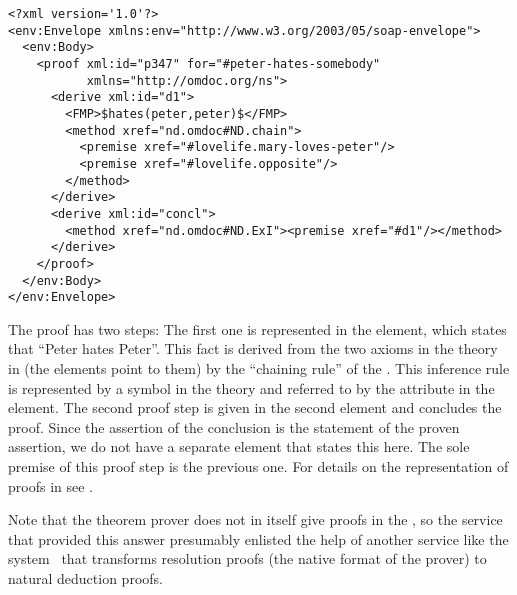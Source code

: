 \begin{omgroup}[id=rpc,short=Communication between Systems]
\begin{lstlisting}[label=lst:rpc-proof,mathescape,
  caption={A proof that Peter hates someone}]
<?xml version='1.0'?>
<env:Envelope xmlns:env="http://www.w3.org/2003/05/soap-envelope">
  <env:Body>
    <proof xml:id="p347" for="#peter-hates-somebody"
           xmlns="http://omdoc.org/ns"> 
      <derive xml:id="d1">
        <FMP>$hates(peter,peter)$</FMP>
        <method xref="nd.omdoc#ND.chain">
          <premise xref="#lovelife.mary-loves-peter"/>
          <premise xref="#lovelife.opposite"/>
        </method>
      </derive>
      <derive xml:id="concl">
        <method xref="nd.omdoc#ND.ExI"><premise xref="#d1"/></method>
      </derive>
    </proof>
  </env:Body>
</env:Envelope>
\end{lstlisting} 
The proof has two steps: The first one is represented in the {} element,
which states that ``Peter hates Peter''. This fact is derived from the two axioms in the
theory {} in {} (the {} elements
point to them) by the ``chaining rule'' of the
{}. This inference rule is represented by a symbol
in the theory {} and referred to by the {} attribute
in the {} element.  The second proof step is given in the second
{} element and concludes the proof. Since the assertion of the conclusion
is the statement of the proven assertion, we do not have a separate {}
element that states this here. The sole premise of this proof step is the previous one.
For details on the representation of proofs in {\omdoc} see {}.

Note that the {\spass} theorem prover does not in itself give proofs in the
{}, so the {\spass} service that provided this
answer presumably enlisted the help of another {\mathwebws} service like the {\tramp}
system~\cite{Meier:sdttom00} that transforms resolution proofs (the native format of the
{\spass} prover) to natural deduction proofs.
\end{omgroup}


